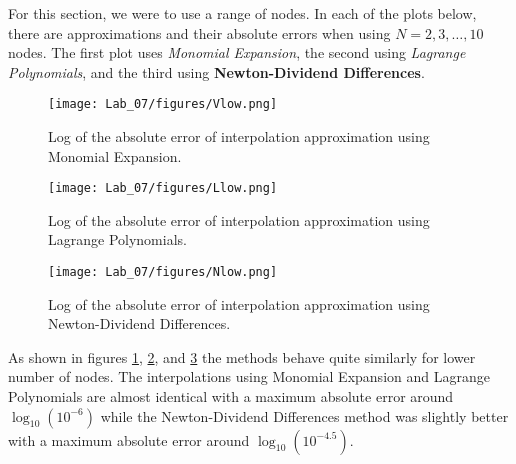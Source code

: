 \documentclass{article}
\begin{document}
\subsubsection{}
For this section, we were to use a range of nodes. In each of the plots below, there are approximations and their absolute errors when using \(N=2,3,\dots,10\) nodes. The first plot uses \textit{Monomial Expansion}, the second using \textit{Lagrange Polynomials}, and the third using \textbf{Newton-Dividend Differences}.
\begin{figure}[h!]
    \centering
    \texttt{[image: Lab\_07/figures/Vlow.png]}
    \caption{Log of the absolute error of interpolation approximation using Monomial Expansion.}
    \label{fig:Vlow}
\end{figure}
\begin{figure}[h!]
    \centering
    \texttt{[image: Lab\_07/figures/Llow.png]}
    \caption{Log of the absolute error of interpolation approximation using Lagrange Polynomials.}
    \label{fig:Llow}
\end{figure}
\newpage
\begin{figure}[h!]
    \centering
    \texttt{[image: Lab\_07/figures/Nlow.png]}
    \caption{Log of the absolute error of interpolation approximation using Newton-Dividend Differences.}
    \label{fig:Nlow}
\end{figure}
As shown in figures \ref{fig:Vlow}, \ref{fig:Llow}, and \ref{fig:Nlow} the methods behave quite similarly for lower number of nodes. The interpolations using Monomial Expansion and Lagrange Polynomials are almost identical with a maximum absolute error around \(\log_{10}(10^{-6})\) while the Newton-Dividend Differences method was slightly better with a maximum absolute error around \(\log_{10}(10^{-4.5})\).
\end{document}
